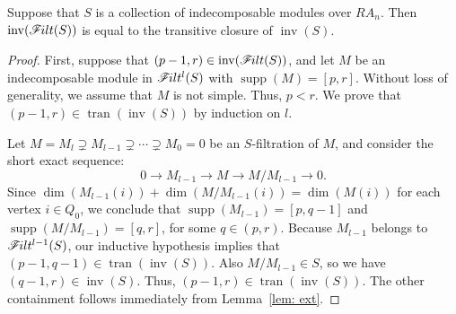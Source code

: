 \documentclass[ALCO,ThmDefs,Unicode,epreuves]{cedram}
\DeclareMathOperator{\supp}{supp}
\DeclareMathOperator{\inv}{inv}
\newcommand{\filt}{\mathscr{F}\Mk ilt}
\newcommand{\tran}{\operatorname{tran}}
\renewcommand{\1}{\hat{1}}
\newcommand{\0}{\hat{0}}
\newcommand*{\Mk}{\mkern -2mu}
\begin{document}
\begin{lemma}\label{filt = tran}
Suppose that $S$ is a collection of indecomposable modules over $RA_n$.
Then $\inv(\filt(S))$ is equal to the transitive closure of $\inv(S)$.
\end{lemma}
\begin{proof}
First, suppose that $(p-1,r)\in \inv(\filt(S))$, and let $M$ be an indecomposable module in $\filt^l(S)$ with $\supp(M) = [p, r]$.
Without loss of generality, we assume that $M$ is not simple.
Thus, $p<r$.
We prove that $(p-1,r)\in \tran(\inv(S))$ by induction on $l$.

Let $M=M_{l}\supsetneq M_{l-1} \supsetneq \cdots
 \supsetneq M_0 =0$ be an $S$-filtration of $M$, and consider the short exact sequence:
\[
0\to M_{l-1} \to M\to M/M_{l-1}\to 0.
\]
Since ${\dim(M_{l-1}(i)) + \dim(M/M_{l-1}(i)) = \dim(M(i))}$ for each
vertex $i\in Q_0$, we conclude that $\supp(M_{l-1})=[p,q-1]$ and $\supp(M/M_{l-1}) =[q,r]$, for some $q\in (p,r)$.
Because $M_{l-1}$ belongs to $\filt^{l-1}(S)$, our inductive hypothesis implies that $(p-1,q-1)\in\tran(\inv(S))$.
Also $M/M_{l-1}\in S$, so we have $(q-1,r)\in \inv(S)$.
Thus, $(p-1,r)\in \tran(\inv(S))$.
The other containment follows immediately from Lemma~\ref{lem:
 ext}.
\end{proof}
\end{document}
